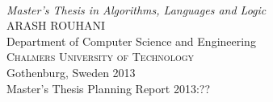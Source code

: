 \hypersetup{pageanchor=false} %
\begin{titlepage}

\mbox{}
\vfill
\addtolength{\voffset}{2cm}
\begin{flushleft}
	{ \\[0.5cm]
	\emph{\Large Master's Thesis in Algorithms, Languages and Logic} \\[.8cm]
	
	{\huge ARASH ROUHANI}\\[.8cm]
	
	{\Large Department of Computer Science and Engineering \\
	\textsc{Chalmers University of Technology} \\
	Gothenburg, Sweden 2013 \\
	Master's Thesis Planning Report 2013:??\\
	} 
	}
\end{flushleft}

\end{titlepage}
\ClearShipoutPicture





